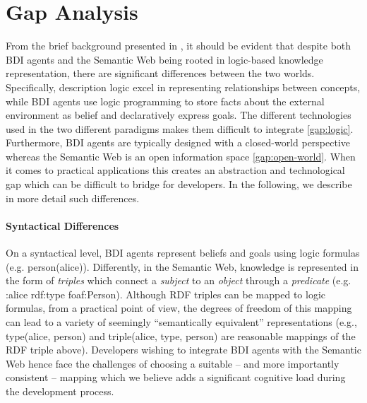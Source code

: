 \documentclass[
]{ceurart}
\begin{document}
\section{Gap Analysis}
\label{sec:gap-analysis}

From the brief background presented in , 
it should be evident that
despite both \ac{BDI} agents and the Semantic Web being rooted in logic-based knowledge representation,
there are significant differences between the two worlds.
Specifically, description logic excel in representing relationships between concepts, while \ac{BDI} agents use logic programming to store facts about the external environment as belief and declaratively express goals.
The different technologies used in the two different paradigms makes them difficult to integrate \ref{gap:logic}.
%
Furthermore, \ac{BDI} agents are typically designed with a closed-world perspective whereas the Semantic Web is an open information space \ref{gap:open-world}.
%
When it comes to practical applications this creates an abstraction and technological gap
which can be difficult to bridge for developers.
%
In the following, we describe in more detail such differences.

\paragraph{Syntactical Differences}

On a syntactical level, \ac{BDI} agents represent beliefs and goals using logic formulas
(e.g. \textsf{person(alice)}).
%
Differently, in the Semantic Web, knowledge is represented in the form of \emph{triples} which connect a \emph{subject} to an \emph{object} through a \emph{predicate} (e.g. \textsf{:alice rdf:type foaf:Person}).
%
Although \ac{RDF} triples can be mapped to logic formulas, from a practical point of view, the degrees of freedom of this mapping can lead to a variety of seemingly ``semantically equivalent'' representations (e.g., \textsf{type(alice, person)} and \textsf{triple(alice, type, person)} are reasonable mappings of the \ac{RDF} triple above).
%
Developers wishing to integrate \ac{BDI} agents with the Semantic Web hence face the challenges of choosing a suitable -- and more importantly consistent -- mapping which we believe adds a significant cognitive load during the development process.
\end{document}
